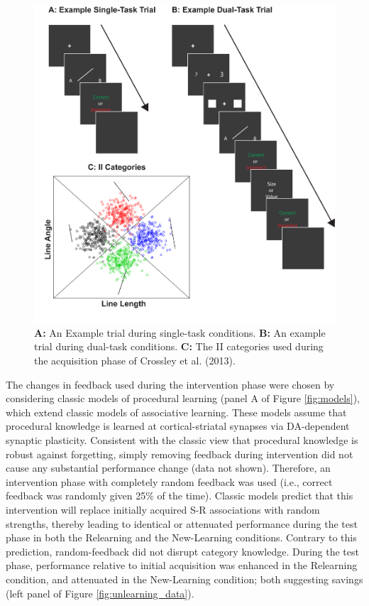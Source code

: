 \begin{figure}[t]
  \centering \includegraphics[width=1.0\textwidth]{../figures/fig_trials.pdf}
  \caption{
    \textbf{A:} An Example trial during single-task conditions.
    \textbf{B:} An example trial during dual-task conditions.
    \textbf{C:} The II categories used during the acquisition phase of
    Crossley et al. (2013).
  }
  \label{fig:test_cats}
\end{figure}

The changes in feedback used during the intervention phase were chosen by
considering classic models of procedural learning (panel A of Figure
\ref{fig:models}), which extend classic models of associative learning.
These models assume that procedural knowledge is learned at cortical-striatal
synapses via DA-dependent synaptic plasticity. Consistent with the classic view
that procedural knowledge is robust against forgetting, simply removing feedback
during intervention did not cause any substantial performance change (data not
shown). Therefore, an intervention phase with completely random feedback was
used (i.e., correct feedback was randomly given 25\% of the time). Classic
models predict that this intervention will replace initially acquired S-R
associations with random strengths, thereby leading to identical or attenuated
performance during the test phase in both the Relearning and the New-Learning
conditions. Contrary to this prediction, random-feedback did not disrupt category knowledge. During the test phase, performance relative to initial acquisition was enhanced in the Relearning condition, and attenuated in the New-Learning condition; both suggesting savings
(left panel of Figure \ref{fig:unlearning_data}).

